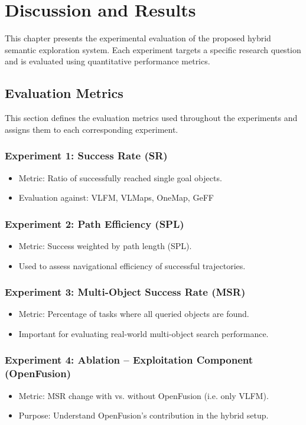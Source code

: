 \chapter{Discussion and Results}
This chapter presents the experimental evaluation of the proposed hybrid semantic exploration system. Each experiment targets a specific research question and is evaluated using quantitative performance metrics.

\section{Evaluation Metrics}
This section defines the evaluation metrics used throughout the experiments and assigns them to each corresponding experiment.

\subsection{Experiment 1: Success Rate (SR)}
\begin{itemize}
    \item Metric: Ratio of successfully reached single goal objects.
    \item Evaluation against: \ac{VLFM}, \ac{VLMaps}, \ac{OneMap}, \ac{GeFF}
\end{itemize}

\subsection{Experiment 2: Path Efficiency (SPL)}
\begin{itemize}
    \item Metric: Success weighted by path length (SPL).
    \item Used to assess navigational efficiency of successful trajectories.
\end{itemize}

\subsection{Experiment 3: Multi-Object Success Rate (MSR)}
\begin{itemize}
    \item Metric: Percentage of tasks where all queried objects are found.
    \item Important for evaluating real-world multi-object search performance.
\end{itemize}

\subsection{Experiment 4: Ablation – Exploitation Component (OpenFusion)}
\begin{itemize}
    \item Metric: MSR change with vs. without OpenFusion (i.e. only \ac{VLFM}).
    \item Purpose: Understand OpenFusion’s contribution in the hybrid setup.
\end{itemize}

